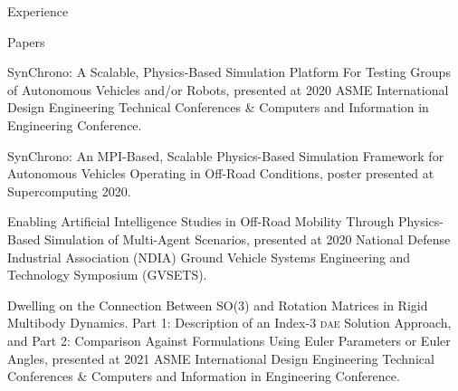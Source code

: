\documentclass{resume} %
\begin{document}
\begin{rSection}{Experience}



\end{rSection}

\begin{rSection}{Papers}
    \begin{rList}
        \item SynChrono: A Scalable, Physics-Based Simulation Platform For Testing Groups of Autonomous Vehicles and/or Robots, presented at 2020 ASME International Design Engineering Technical Conferences \& Computers and Information in Engineering Conference.
        \item SynChrono: An MPI-Based, Scalable Physics-Based Simulation Framework for Autonomous Vehicles Operating in Off-Road Conditions, poster presented at Supercomputing 2020.
        \item Enabling Artificial Intelligence Studies in Off-Road Mobility Through Physics-Based Simulation of Multi-Agent Scenarios, presented at 2020 National Defense Industrial Association (NDIA) Ground Vehicle Systems Engineering and Technology Symposium (GVSETS).
        \item Dwelling on the Connection Between SO(3) and Rotation Matrices in Rigid Multibody Dynamics. Part 1: Description of an Index-3 \textsc{dae} Solution Approach, and Part 2: Comparison Against Formulations Using Euler Parameters or Euler Angles, presented at 2021 ASME International Design Engineering Technical Conferences \& Computers and Information in Engineering Conference.
    \end{rList}
    
\end{rSection}

\end{document}
